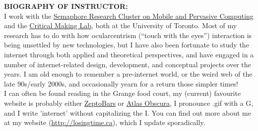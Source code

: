 \documentclass[10pt]{article}
\begin{document}

\textbf{BIOGRAPHY OF INSTRUCTOR:}\\
I work with the \href{http://semaphore.utoronto.ca}{Semaphore Research Cluster on Mobile and Pervasive Computing} and the \href{http://criticalmaking.com}{Critical Making Lab}, both at the University of Toronto. Most of my research has to do with how ocularcentrism (``touch with the eyes'') interaction is being unsettled by new technologies, but I have also been fortunate to study the internet through both applied and theoretical perspectives, and have engaged in a number of internet-related design, development, and conceptual projects over the years. I am old enough to remember a pre-internet world, or the weird web of the late 90s/early 2000s, and occasionally yearn for a return those simpler times!\\ I can often be found reading in the Grange food court, my (current) favourite website is probably either \href{http://zeptobars.ru/en/}{ZeptoBars} or \href{http://www.atlasobscura.com/}{Atlas Obscura}, I pronounce .gif with a G, and I write 'internet' without capitalizing the I. You can find out more about me at my website (\href{http://losingtime.ca}{http://losingtime.ca}), which I update sporadically. 
\end{document}
